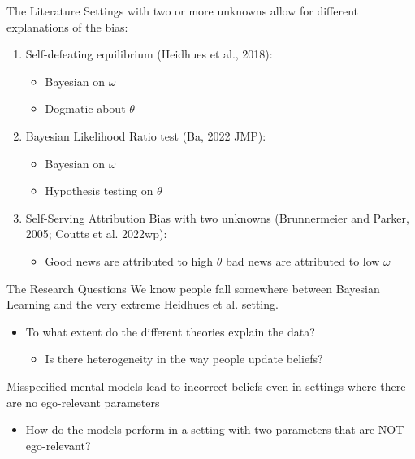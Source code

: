 \documentclass[aspectratio=169]{beamer}
\begin{document}
\begin{frame}{The Literature}
Settings with two or more unknowns allow for different explanations of the bias:\\
\bigskip
\begin{enumerate}
\item Self-defeating equilibrium (Heidhues et al., 2018): 
    \begin{itemize}
        \item Bayesian on $\omega$
        \item Dogmatic about $\theta$
        
    \end{itemize}
    \bigskip
    \item Bayesian Likelihood Ratio test (Ba, 2022 JMP):
    \begin{itemize}
        \item Bayesian on $\omega$ 
        \item Hypothesis testing on $\theta$
    \end{itemize}
    \bigskip
    \item Self-Serving Attribution Bias with two unknowns (Brunnermeier and Parker, 2005; Coutts et al. 2022wp): 
    \begin{itemize}
        \item Good news are attributed to high $\theta$ bad news are attributed to low $\omega$
    \end{itemize}
    
    
    
\end{enumerate}
\end{frame} 

\begin{frame}{The Research Questions}
    We know people fall somewhere between Bayesian Learning and the very extreme Heidhues et al. setting.\\
    \bigskip
    \begin{itemize}
        \item To what extent do the different theories explain the data?\\
        \begin{itemize}
            \item Is there heterogeneity in the way people update beliefs?\\
        \end{itemize}
    \end{itemize}
    \pause
    \bigskip
    Misspecified mental models lead to incorrect beliefs even in settings where there are no ego-relevant parameters
    \bigskip
    \begin{itemize}
        \item How do the models perform in a setting with two parameters that are NOT ego-relevant?\\
    \end{itemize}
\end{frame}
\end{document}
